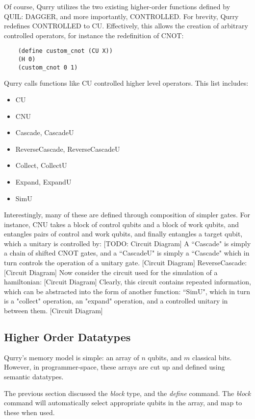 \documentclass[journal]{article}
\begin{document}
    Of course, Qurry utilizes the two existing higher-order functions defined by QUIL: DAGGER, and more importantly, CONTROLLED.
    For brevity, Qurry redefines CONTROLLED to CU.
    Effectively, this allows the creation of arbitrary controlled operators, for instance the redefinition of CNOT:
    \begin{verbatim}
    (define custom_cnot (CU X))
    (H 0)
    (custom_cnot 0 1)
    \end{verbatim}
    Qurry calls functions like CU controlled higher level operators.
    This list includes:
    \begin{itemize}
        \item CU 
        \item CNU
        \item Cascade, CascadeU
        \item ReverseCascade, ReverseCascadeU
        \item Collect, CollectU
        \item Expand, ExpandU
        \item SimU
    \end{itemize}
    Interestingly, many of these are defined through composition of simpler gates.
    For instance, CNU takes a block of control qubits and a block of work qubits, and entangles pairs of control and work qubits, and finally entangles a target qubit, which a unitary is controlled by:
    [TODO: Circuit Diagram]
    A ``Cascade" is simply a chain of shifted CNOT gates, and a ``CascadeU" is simply a ``Cascade" which in turn controls the operation of a unitary gate.
    [Circuit Diagram]
    ReverseCascade:
    [Circuit Diagram]
    Now consider the circuit used for the simulation of a hamiltonian:
    [Circuit Diagram]
    Clearly, this circuit contains repeated information, which can be abstracted into the form of another function: ``SimU", which in turn is a "collect" operation, an "expand" operation, and a controlled unitary in between them.
    [Circuit Diagram]

    \subsection{Higher Order Datatypes}

    Qurry's memory model is simple: an array of $n$ qubits, and $m$ classical bits.
    However, in programmer-space, these arrays are cut up and defined using semantic datatypes.

    The previous section discussed the \emph{block} type, and the \emph{define} command.
    The \emph{block} command will automatically select appropriate qubits in the array, and map to these when used.
\end{document}
